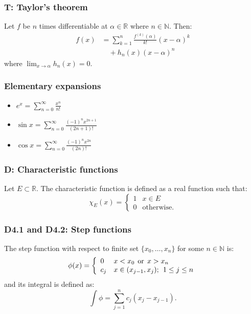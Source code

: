 \documentclass{article}
\begin{document}
\begin{multicols*}{3}
\subsubsection*{T: Taylor's theorem}
Let $f$ be $n$ times differentiable at $\alpha\in\mathbb{R}$
where $n\in\mathbb{N}$. Then:
\begin{align*}f(x)&=\sum_{k=1}^{n}\frac{f^{(k)}(\alpha)}{k!}
(x-\alpha)^k \\ &\quad+h_n(x)(x-\alpha)^n\end{align*}
where $\displaystyle\lim_{x\rightarrow\alpha}h_n(x)=0$.

\subsubsection*{Elementary expansions}
\begin{itemize}
    \item $\displaystyle e^x
    =\sum_{n=0}^{\infty}\frac{x^n}{n!}$

    \item $\displaystyle \sin x
    =\sum_{n=0}^{\infty}\frac{(-1)^n x^{2n+1}}{(2n+1)!}$

    \item $\displaystyle \cos x
    =\sum_{n=0}^{\infty}\frac{(-1)^n x^{2n}}{(2n)!}$
\end{itemize}

\subsubsection*{D: Characteristic functions}
Let $E\subset\mathbb{R}$.
The characteristic function is defined as
a real function such that:
$$\chi_E(x) =
    \left\{
    \begin{array}{ll}
        1  & \mbox{} x \in E \\
        0 & \mbox{otherwise.}
    \end{array}
\right.$$

\subsubsection*{D4.1 and D4.2: Step functions}
The step function with respect to
finite set $\{x_0, \dots, x_n\}$
for some $n \in \mathbb{N}$ is:
$$\phi(x) =
    \left\{
    \begin{array}{ll}
	0  &  x < x_0 \hspace{0.06in} \text{or} \hspace{0.06in} x > x_n \\
	c_j & x \in (x_{j-1}, x_j); \hspace{0.06in} 1 \leq j \leq n
    \end{array}
\right.$$
and its integral is defined as:
$$\int\phi=\sum_{j=1}^{n}c_j(x_j-x_{j-1}).$$


\end{multicols*}
\end{document}
